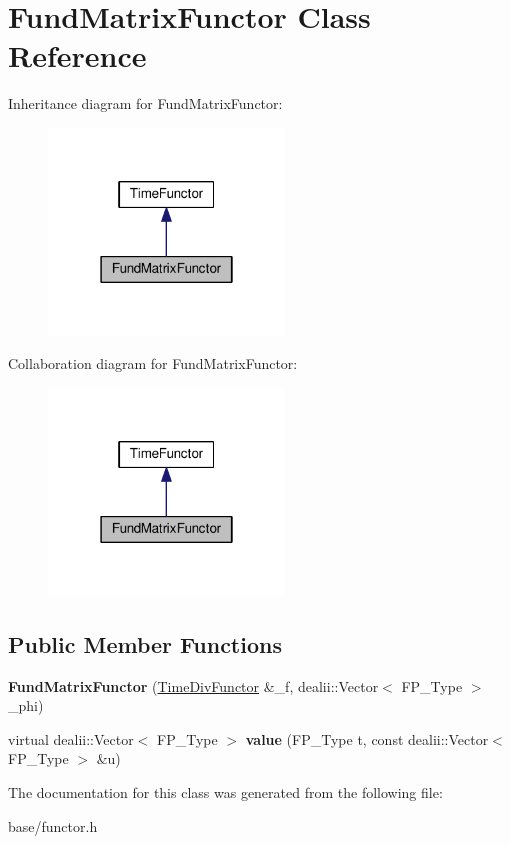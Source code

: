 \hypertarget{classFundMatrixFunctor}{}\section{Fund\+Matrix\+Functor Class Reference}
\label{classFundMatrixFunctor}


Inheritance diagram for Fund\+Matrix\+Functor\+:\nopagebreak
\begin{figure}[H]
\begin{center}
\leavevmode
\includegraphics[width=178pt]{classFundMatrixFunctor__inherit__graph}
\end{center}
\end{figure}


Collaboration diagram for Fund\+Matrix\+Functor\+:\nopagebreak
\begin{figure}[H]
\begin{center}
\leavevmode
\includegraphics[width=178pt]{classFundMatrixFunctor__coll__graph}
\end{center}
\end{figure}
\subsection*{Public Member Functions}
\begin{DoxyCompactItemize}
\item 
\mbox{\label{classFundMatrixFunctor_a46429e4a1ff578984335f056f2b52d50}} 
{\bfseries Fund\+Matrix\+Functor} (\hyperlink{classTimeDivFunctor}{Time\+Div\+Functor} \&\+\_\+f, dealii\+::\+Vector$<$ F\+P\+\_\+\+Type $>$ \+\_\+phi)
\item 
\mbox{\label{classFundMatrixFunctor_a6e2535837249caf2d82065cffa45f214}} 
virtual dealii\+::\+Vector$<$ F\+P\+\_\+\+Type $>$ {\bfseries value} (F\+P\+\_\+\+Type t, const dealii\+::\+Vector$<$ F\+P\+\_\+\+Type $>$ \&u)
\end{DoxyCompactItemize}


The documentation for this class was generated from the following file\+:\begin{DoxyCompactItemize}
\item 
base/functor.\+h\end{DoxyCompactItemize}
